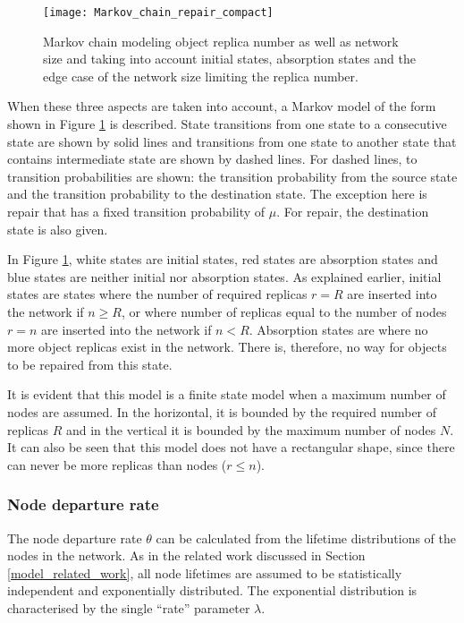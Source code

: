 \begin{figure}[htbp]
 \centering
 \texttt{[image: Markov\_chain\_repair\_compact]}
 \caption{Markov chain modeling object replica number as well as network size and taking into account initial states, absorption states and the edge case of the network size limiting the replica number.}
 \label{fig_markov_chain}
\end{figure}
%
When these three aspects are taken into account, a Markov model of the form shown in Figure \ref{fig_markov_chain} is described. State transitions from one state to a consecutive state are shown by solid lines and transitions from one state to another state that contains intermediate state are shown by dashed lines. For dashed lines, to transition probabilities are shown: the transition probability from the source state and the transition probability to the destination state. The exception here is repair that has a fixed transition probability of $\mu$. For repair, the destination state is also given.

In Figure \ref{fig_markov_chain}, white states are initial states, red states are absorption states and blue states are neither initial nor absorption states. As explained earlier, initial states are states where the number of required replicas $r=R$ are inserted into the network if $n\geq R$, or where number of replicas equal to the number of nodes $r=n$ are inserted into the network if $n < R$. Absorption states are where no more object replicas exist in the network. There is, therefore, no way for objects to be repaired from this state.

It is evident that this model is a finite state model when a maximum number of nodes are assumed. In the horizontal, it is bounded by the required number of replicas $R$ and in the vertical it is bounded by the maximum number of nodes $N$. It can also be seen that this model does not have a rectangular shape, since there can never be more replicas than nodes ($r\leq n$).

\subsubsection{Node departure rate}
\label{node_departure_rate}

The node departure rate $\theta$ can be calculated from the lifetime distributions of the nodes in the network. As in the related work discussed in Section \ref{model_related_work}, all node lifetimes are assumed to be statistically independent and exponentially distributed. The exponential distribution is characterised by the single ``rate'' parameter $\lambda$.

